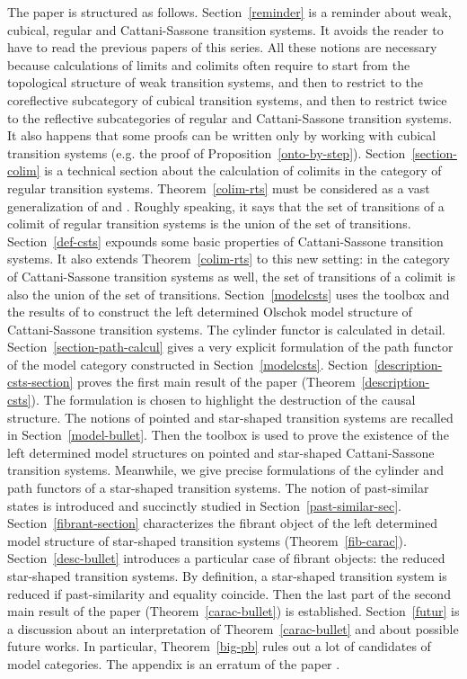 \documentclass[a4paper,12pt]{amsart}
\begin{document}
The paper is structured as follows. Section~\ref{reminder} is a
reminder about weak, cubical, regular and Cattani-Sassone transition
systems. It avoids the reader to have to read the previous papers of
this series. All these notions are necessary because calculations of
limits and colimits often require to start from the topological
structure of weak transition systems, and then to restrict to the
coreflective subcategory of cubical transition systems, and then to
restrict twice to the reflective subcategories of regular and
Cattani-Sassone transition systems. It also happens that some proofs
can be written only by working with cubical transition systems
(e.g. the proof of Proposition~\ref{onto-by-step}).
Section~\ref{section-colim} is a technical section about the
calculation of colimits in the category of regular transition systems.
Theorem~\ref{colim-rts} must be considered as a vast generalization of
\cite[Theorem~4.7]{hdts} and \cite[Proposition~A.3]{csts}. Roughly
speaking, it says that the set of transitions of a colimit of regular
transition systems is the union of the set of transitions.
Section~\ref{def-csts} expounds some basic properties of
Cattani-Sassone transition systems. It also extends
Theorem~\ref{colim-rts} to this new setting: in the category of
Cattani-Sassone transition systems as well, the set of transitions of
a colimit is also the union of the set of transitions.
Section~\ref{modelcsts} uses the toolbox \cite{leftdet} and the
results of \cite{biscsts1} to construct the left determined Olschok
model structure of Cattani-Sassone transition systems. The cylinder
functor is calculated in detail.  Section~\ref{section-path-calcul}
gives a very explicit formulation of the path functor of the model
category constructed in Section~\ref{modelcsts}.
Section~\ref{description-csts-section} proves the first main result of
the paper (Theorem~\ref{description-csts}).  The formulation is chosen
to highlight the destruction of the causal structure.  The notions of
pointed and star-shaped transition systems are recalled in
Section~\ref{model-bullet}. Then the toolbox \cite{leftdet} is used to
prove the existence of the left determined model structures on pointed
and star-shaped Cattani-Sassone transition systems. Meanwhile, we give
precise formulations of the cylinder and path functors of a
star-shaped transition systems.  The notion of past-similar states is
introduced and succinctly studied in
Section~\ref{past-similar-sec}. Section~\ref{fibrant-section}
characterizes the fibrant object of the left determined model
structure of star-shaped transition systems (Theorem~\ref{fib-carac}).
Section~\ref{desc-bullet} introduces a particular case of fibrant
objects: the reduced star-shaped transition systems. By definition, a
star-shaped transition system is reduced if past-similarity and
equality coincide. Then the last part of the second main result of the
paper (Theorem~\ref{carac-bullet}) is established. Section~\ref{futur}
is a discussion about an interpretation of Theorem~\ref{carac-bullet}
and about possible future works. In particular, Theorem~\ref{big-pb}
rules out a lot of candidates of model categories. The appendix is an
erratum of the paper \cite{biscsts1}.
\end{document}
